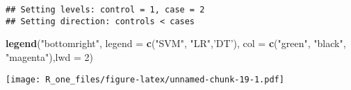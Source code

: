 \documentclass[]{article}
\newenvironment{Shaded}{\begin{snugshade}}{\end{snugshade}}
\newcommand{\DataTypeTok}[1]{\textcolor[rgb]{0.13,0.29,0.53}{#1}}
\newcommand{\DecValTok}[1]{\textcolor[rgb]{0.00,0.00,0.81}{#1}}
\newcommand{\KeywordTok}[1]{\textcolor[rgb]{0.13,0.29,0.53}{\textbf{#1}}}
\newcommand{\NormalTok}[1]{#1}
\newcommand{\StringTok}[1]{\textcolor[rgb]{0.31,0.60,0.02}{#1}}
\begin{document}
\begin{verbatim}
## Setting levels: control = 1, case = 2
## Setting direction: controls < cases
\end{verbatim}

\begin{Shaded}
\begin{Highlighting}[]
\KeywordTok{legend}\NormalTok{(}\StringTok{"bottomright"}\NormalTok{, }\DataTypeTok{legend =} \KeywordTok{c}\NormalTok{(}\StringTok{"SVM"}\NormalTok{, }\StringTok{"LR"}\NormalTok{,}\StringTok{'DT'}\NormalTok{), }\DataTypeTok{col =} \KeywordTok{c}\NormalTok{(}\StringTok{"green"}\NormalTok{, }\StringTok{"black"}\NormalTok{, }\StringTok{"magenta"}\NormalTok{),}\DataTypeTok{lwd =} \DecValTok{2}\NormalTok{)}
\end{Highlighting}
\end{Shaded}

\texttt{[image: R\_one\_files/figure-latex/unnamed-chunk-19-1.pdf]}
\end{document}
